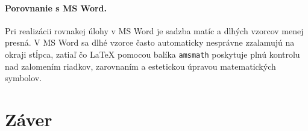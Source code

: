 \documentclass[10pt,twocolumn,twoside,slovak,a4paper]{article}
\begin{document}
\paragraph{Porovnanie s MS Word.} Pri realizácii rovnakej úlohy v MS Word je sadzba matíc a dlhých vzorcov menej presná. V MS Word sa dlhé vzorce často automaticky nesprávne zzalamujú na okraji stĺpca, zatiaľ čo LaTeX pomocou balíka \texttt{amsmath} poskytuje plnú kontrolu nad zalomením riadkov, zarovnaním a estetickou úpravou matematických symbolov.



\section{Záver} \label{zaver} %






\end{document}
